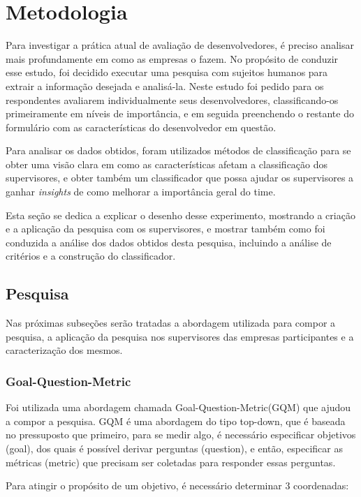 \chapter[Metodolodia]{Metodologia}

Para investigar a prática atual de avaliação de desenvolvedores, é preciso analisar mais profundamente em como as empresas o fazem. No propósito de conduzir esse estudo, foi decidido executar uma pesquisa com sujeitos humanos para extrair a informação desejada e analisá-la. Neste estudo foi pedido para os respondentes avaliarem individualmente seus desenvolvedores, classificando-os primeiramente em níveis de importância, e em seguida preenchendo o restante do formulário com as características do desenvolvedor em questão.

Para analisar os dados obtidos, foram utilizados métodos de classificação para se obter uma visão clara em como as características afetam a classificação dos supervisores, e obter também um classificador que possa ajudar os supervisores a ganhar \textit{insights} de como melhorar a importância geral do time.

Esta seção se dedica a explicar o desenho desse experimento, mostrando a criação e a aplicação da pesquisa com os supervisores, e mostrar também como foi conduzida a análise dos dados obtidos desta pesquisa, incluindo a análise de critérios e a construção do classificador.

\section{Pesquisa}\label{secao3.2}

Nas próximas subseções serão tratadas a abordagem utilizada para compor a pesquisa, a aplicação da pesquisa nos supervisores das empresas participantes e a caracterização dos mesmos.

\subsection{Goal-Question-Metric}\label{secao3.2.1}
Foi utilizada uma abordagem chamada Goal-Question-Metric(GQM) \cite{Basili1994} que ajudou a compor a pesquisa. GQM é uma abordagem do tipo top-down, que é baseada no pressuposto que primeiro, para se medir algo, é necessário especificar objetivos (goal), dos quais é possível derivar perguntas (question), e então, especificar as métricas (metric) que precisam ser coletadas para responder essas perguntas.

Para atingir o propósito de um objetivo, é necessário determinar 3 coordenadas:

